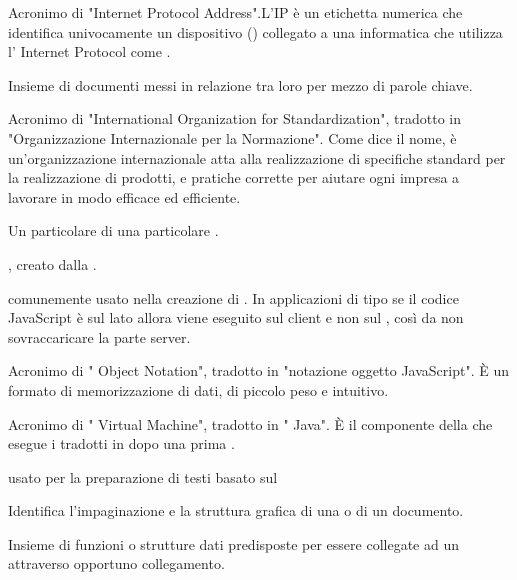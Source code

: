 { 
{Acronimo di "Internet Protocol Address".L'IP è un etichetta numerica che identifica univocamente un dispositivo () collegato a una  informatica che utilizza l' Internet Protocol come .}

{Insieme di documenti messi in relazione tra loro per mezzo di parole chiave.} 

{Acronimo di "International Organization for Standardization", tradotto in "Organizzazione Internazionale per la Normazione". Come dice il nome, è un'organizzazione internazionale atta alla realizzazione di specifiche standard per la realizzazione di prodotti,  e pratiche corrette per aiutare ogni impresa a lavorare in modo efficace ed efficiente.}

{Un particolare  di una particolare .}




{ , creato dalla .}

{  comunemente usato nella creazione di . In applicazioni di tipo  se il codice JavaScript è sul lato  allora viene eseguito sul client e non sul , così da non sovraccaricare la parte server.}

{Acronimo di " Object Notation", tradotto in "notazione oggetto JavaScript". \`{E} un formato di memorizzazione di dati, di piccolo peso e intuitivo.}

{Acronimo di " Virtual Machine", tradotto in " Java". \`{E} il componente della  che esegue i  tradotti in  dopo una prima .}




{ usato per la preparazione di testi basato sul  }

{Identifica l'impaginazione e la struttura grafica di una  o di un documento.}

{Insieme di funzioni o strutture dati predisposte per essere collegate ad un   attraverso opportuno collegamento.}

}
